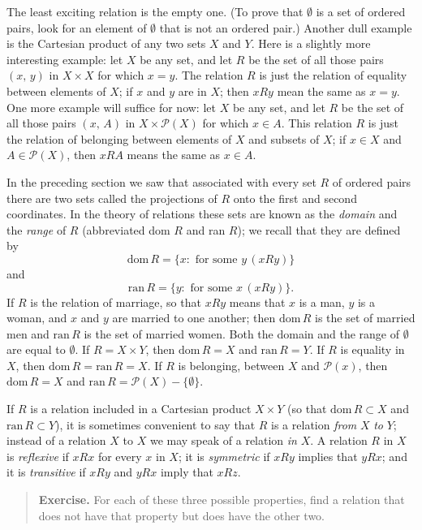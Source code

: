 The least exciting relation is the empty one. (To prove that $\emptyset$ is a set of ordered pairs, look for an element of $\emptyset$ that is not an ordered pair.) Another dull example is the Cartesian product of any two sets $X$ and $Y$. Here is a slightly more interesting example: let $X$ be any set, and let $R$ be the set of all those pairs $(x, \, y)$ in $X \times X$ for which $x = y$. The relation $R$ is just the relation of equality between elements of $X$; if $x$ and $y$ are in $X$; then $xRy$ mean the same as $x = y$. One more example will suffice for now: let $X$ be any set, and let $R$ be the set of all those pairs $(x, \, A)$ in $X \times \mathcal{P}(X)$ for which $x \in A$. This relation $R$ is just the relation of belonging between elements of $X$ and subsets of $X$; if $x \in X$ and $A \in \mathcal{P}(X)$, then $xRA$ means the same as $x \in A$.

In the preceding section we saw that associated with every set $R$ of ordered pairs there are two sets called the projections of $R$ onto the first and second coordinates. In the theory of relations these sets are known as the \textit{domain} and the \textit{range} of $R$ (abbreviated dom $R$ and ran $R$); we recall that they are defined by
\[
	\text{dom} \, R = \{ x : \text{ for some } y \, (xRy)\}
\]
and
\[
	\text{ran} \, R = \{ y : \text{ for some } x \, (xRy)\}.
\]
If $R$ is the relation of marriage, so that $xRy$ means that $x$ is a man, $y$ is a woman, and $x$ and $y$ are married to one another; then $\text{dom} \, R$ is the set of married men and $\text{ran} \, R$ is the set of married women. Both the domain and the range of $\emptyset$ are equal to $\emptyset$. If $R = X \times Y$, then $\text{dom} \, R = X$ and $\text{ran} \, R = Y$. If $R$ is equality in $X$, then $\text{dom} \, R = \text{ran} \, R = X$. If $R$ is belonging, between $X$ and $\mathcal{P}(x)$, then $\text{dom} \, R = X$ and $\text{ran} \, R = \mathcal{P}(X) - \{\emptyset\}$.

If $R$ is a relation included in a Cartesian product $X \times Y$ (so that $\text{dom} \, R \subset X$ and $\text{ran} \, R \subset Y$), it is sometimes convenient to say that $R$ is a relation \textit{from} $X$ \textit{to} $Y$; instead of a relation $X$ to $X$ we may speak of a relation \textit{in} $X$. A relation $R$ in $X$ is \textit{reflexive} if $xRx$ for every $x$ in $X$; it is \textit{symmetric} if $xRy$ implies that $yRx$; and it is \textit{transitive} if $xRy$ and $yRx$ imply that $xRz$.

\begin{quote}
	\textbf{Exercise.} For each of these three possible properties, find a relation that does not have that property but does have the other two.
\end{quote}

